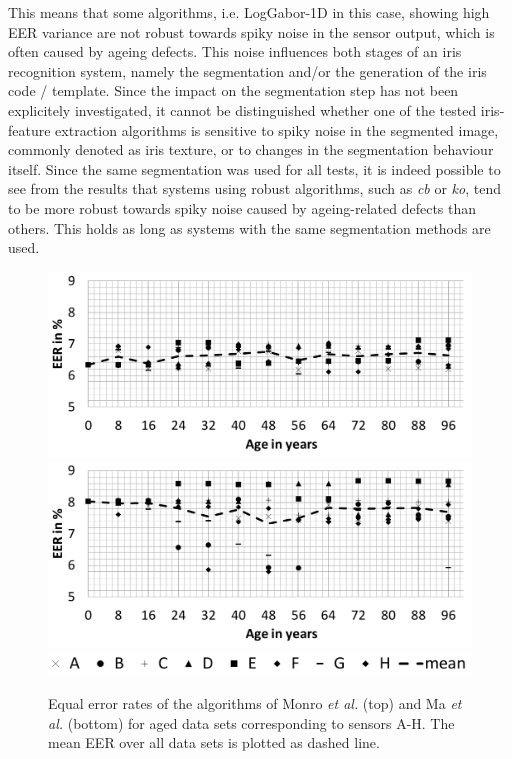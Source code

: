 \documentclass[10pt,twocolumn,letterpaper]{article}
\providecommand{\etal}[0]{\textit{et al.} }
\begin{document}
This means that some algorithms, i.e. LogGabor-1D in this case, showing high EER variance are not robust towards spiky noise in the sensor output, which is often caused by ageing defects. This noise influences both stages of an iris recognition system, namely the segmentation and/or the generation of the iris code / template. Since the impact on the segmentation step has not been explicitely investigated, it cannot be distinguished whether one of the tested iris-feature extraction algorithms is sensitive to spiky noise in the segmented image, commonly denoted as iris texture, or to changes in the segmentation behaviour itself. Since the same segmentation was used for all tests, it is indeed possible to see from the results that systems using robust algorithms, such as \emph{cb} or \emph{ko}, tend to be more robust towards spiky noise caused by ageing-related defects than others. This holds as long as systems with the same segmentation methods are used.
 
  \begin{figure}
  \centering
  \includegraphics[width=\linewidth]{img/dct.png}
  \includegraphics[width=\linewidth]{img/qsw.png}
  \includegraphics[width=\linewidth]{img/legend.png}
  \caption{Equal error rates of the algorithms of Monro \etal (top) and Ma \etal (bottom) for aged data sets corresponding to sensors A-H. The mean EER over all data sets is plotted as dashed line.}
  \label{fig:allSensors}
\end{figure}
 
\end{document}

